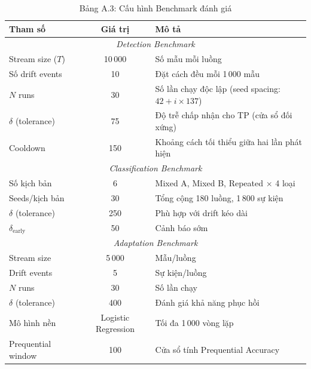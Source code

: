 \begin{table}[H]
	\centering
	\caption*{Bảng A.3: Cấu hình Benchmark đánh giá}
	\begin{tabular}{|l|c|p{7cm}|}
		\hline
		\textbf{Tham số} & \textbf{Giá trị} & \textbf{Mô tả} \\
		\hline
		\multicolumn{3}{|c|}{\textit{Detection Benchmark}} \\
		\hline
		Stream size ($T$) & 10\,000 & Số mẫu mỗi luồng \\
		Số drift events & 10 & Đặt cách đều mỗi 1\,000 mẫu \\
		$N$ runs & 30 & Số lần chạy độc lập (seed spacing: $42 + i \times 137$) \\
		$\delta$ (tolerance) & 75 & Độ trễ chấp nhận cho TP (cửa sổ đối xứng) \\
		Cooldown & 150 & Khoảng cách tối thiểu giữa hai lần phát hiện \\
		\hline
		\multicolumn{3}{|c|}{\textit{Classification Benchmark}} \\
		\hline
		Số kịch bản & 6 & Mixed A, Mixed B, Repeated $\times$ 4 loại \\
		Seeds/kịch bản & 30 & Tổng cộng 180 luồng, 1\,800 sự kiện \\
		$\delta$ (tolerance) & 250 & Phù hợp với drift kéo dài \\
		$\delta_{\text{early}}$ & 50 & Cảnh báo sớm \\
		\hline
		\multicolumn{3}{|c|}{\textit{Adaptation Benchmark}} \\
		\hline
		Stream size & 5\,000 & Mẫu/luồng \\
		Drift events & 5 & Sự kiện/luồng \\
		$N$ runs & 30 & Số lần chạy \\
		$\delta$ (tolerance) & 400 & Đánh giá khả năng phục hồi \\
			Mô hình nền & Logistic Regression & Tối đa 1\,000 vòng lặp \\
		Prequential window & 100 & Cửa sổ tính Prequential Accuracy \\
		\hline
	\end{tabular}
\end{table}

